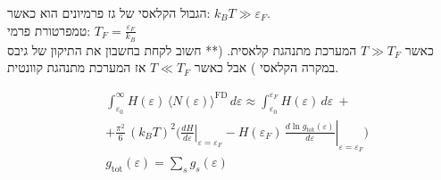 \begin{cheatformula}[גבולות]
הגבול הקלאסי של גז פרמיונים הוא כאשר:
$k_BT \gg \varepsilon_F$. \\
טמפרטורת פרמי: $T_F = \frac{\varepsilon_F}{k_B}$\\
כאשר $T \gg T_F$ המערכת מתנהגת קלאסית. (** חשוב לקחת בחשבון את התיקון של גיבס במקרה הקלאסי )
אבל כאשר $T \ll T_F$ אז המערכת מתנהגת קוונטית.
\end{cheatformula}
\begin{cheatformula}
\begin{align*}
&\int_{\varepsilon_0}^{\infty} H(\varepsilon)\,\bigl\langle N(\varepsilon)\bigr\rangle^{\mathrm{FD}}\,d\varepsilon
\approx \int_{\varepsilon_0}^{\varepsilon_F} H(\varepsilon)\,d\varepsilon \ + \\[6pt]
&+ \frac{\pi^2}{6}\,(k_B T)^2
\Biggl(
\left.\frac{dH}{d\varepsilon}\right|_{\varepsilon=\varepsilon_F}
- H(\varepsilon_F)\,
\left.\frac{d\ln g_{\mathrm{tot}}(\varepsilon)}{d\varepsilon}\right|_{\varepsilon=\varepsilon_F}
\Biggr)\\
&g_{\mathrm{tot}}\left(\varepsilon\right) = \sum_s g_s\left(\varepsilon\right) \\
\end{align*}

\end{cheatformula}
